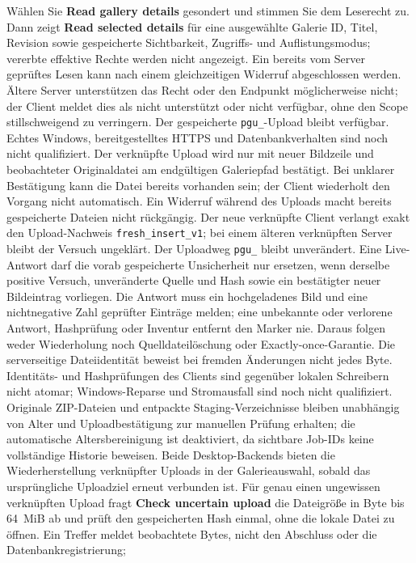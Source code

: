 \documentclass[11pt,a4paper]{article}
\newcommand{\ui}[1]{\textbf{#1}}
\begin{document}
Wählen Sie \ui{Read gallery details}
gesondert und stimmen Sie dem Leserecht zu. Dann zeigt \ui{Read selected
details} für eine ausgewählte Galerie ID, Titel, Revision sowie gespeicherte
Sichtbarkeit, Zugriffs- und Auflistungsmodus; vererbte effektive Rechte werden
nicht angezeigt. Ein bereits vom Server geprüftes Lesen kann nach einem
gleichzeitigen Widerruf abgeschlossen werden. Ältere Server unterstützen das
Recht oder den Endpunkt möglicherweise nicht; der Client meldet dies als
nicht unterstützt oder nicht verfügbar, ohne den Scope stillschweigend zu
verringern. Der gespeicherte \texttt{pgu\_}-Upload bleibt verfügbar. Echtes
Windows, bereitgestelltes HTTPS und Datenbankverhalten sind noch nicht
qualifiziert.
Der verknüpfte Upload wird nur mit neuer Bildzeile und beobachteter Originaldatei
am endgültigen Galeriepfad bestätigt. Bei unklarer Bestätigung kann die Datei
bereits vorhanden sein; der Client wiederholt den Vorgang nicht automatisch.
Ein Widerruf während des Uploads macht bereits gespeicherte Dateien nicht rückgängig.
Der neue verknüpfte Client verlangt exakt den Upload-Nachweis
\texttt{fresh\_insert\_v1}; bei einem älteren verknüpften Server bleibt der
Versuch ungeklärt. Der Uploadweg \texttt{pgu\_} bleibt unverändert.
Eine Live-Antwort darf die vorab gespeicherte Unsicherheit nur ersetzen, wenn
derselbe positive Versuch, unveränderte Quelle und Hash sowie ein bestätigter
neuer Bildeintrag vorliegen. Die Antwort muss ein hochgeladenes Bild und eine
nichtnegative Zahl geprüfter Einträge melden; eine unbekannte oder verlorene
Antwort, Hashprüfung oder Inventur entfernt den Marker nie. Daraus folgen weder
Wiederholung noch Quelldateilöschung oder Exactly-once-Garantie.
Die serverseitige Dateiidentität beweist bei fremden Änderungen nicht jedes Byte.
Identitäts- und Hashprüfungen des Clients sind gegenüber lokalen Schreibern nicht
atomar; Windows-Reparse und Stromausfall sind noch nicht qualifiziert.
Originale ZIP-Dateien und entpackte Staging-Verzeichnisse bleiben unabhängig
von Alter und Uploadbestätigung zur manuellen Prüfung erhalten; die automatische
Altersbereinigung ist deaktiviert, da sichtbare Job-IDs keine vollständige
Historie beweisen.
Beide Desktop-Backends bieten die Wiederherstellung verknüpfter Uploads in
der Galerieauswahl, sobald das ursprüngliche Uploadziel erneut verbunden ist.
Für genau einen ungewissen verknüpften Upload fragt \ui{Check uncertain upload}
die Dateigröße in Byte bis 64~MiB ab und prüft den gespeicherten Hash einmal,
ohne die lokale Datei zu öffnen. Ein Treffer
meldet beobachtete Bytes, nicht den Abschluss oder die Datenbankregistrierung;
\end{document}
